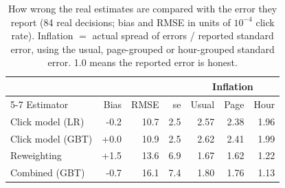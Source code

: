 \begin{table}[t]
\centering
\caption{How wrong the real estimates are compared with the error they report (84 real decisions; bias and RMSE in units of $10^{-4}$ click rate). Inflation $=$ actual spread of errors / reported standard error, using the usual, page-grouped or hour-grouped standard error. 1.0 means the reported error is honest.}
\label{tab:inflation}
\small
\setlength{\tabcolsep}{4pt}
\begin{tabular}{lrrrrrr}
\toprule
& & & & \multicolumn{3}{c}{Inflation}\\
\cmidrule(lr){5-7}
Estimator & Bias & RMSE & se & Usual & Page & Hour\\
\midrule
Click model (LR) & -0.2 & 10.7 & 2.5 & 2.57 & 2.38 & 1.96\\
Click model (GBT) & +0.0 & 10.9 & 2.5 & 2.62 & 2.41 & 1.99\\
Reweighting & +1.5 & 13.6 & 6.9 & 1.67 & 1.62 & 1.22\\
Combined (GBT) & -0.7 & 16.1 & 7.4 & 1.80 & 1.76 & 1.13\\
\bottomrule
\end{tabular}
\end{table}
